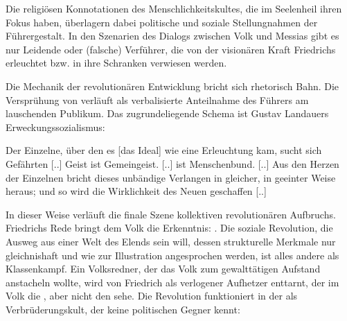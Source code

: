 Die religiösen Konnotationen des Menschlichkeitskultes, die im Seelenheil
ihren Fokus haben, überlagern dabei politische und soziale Stellungnahmen der
Führergestalt. In den Szenarien des Dialogs zwischen Volk und Messias gibt es
nur Leidende oder (falsche) Verführer, die von der visionären Kraft Friedrichs
erleuchtet bzw. in ihre Schranken verwiesen werden.

Die Mechanik der revolutionären Entwicklung bricht sich rhetorisch Bahn. Die
Versprühung von \Cite{Geist} verläuft als verbalisierte Anteilnahme des
Führers am lauschenden Publikum. Das zugrundeliegende Schema ist Gustav
Landauers Erweckungssozialismus:\label{LANDAUER}

\begin{BlockQuote}
  Der Einzelne, über den es [das Ideal] wie eine Erleuchtung kam, sucht sich
  Gefährten [..] Geist ist Gemeingeist. [..] ist Menschenbund. [..] Aus den
  Herzen der Einzelnen bricht dieses unbändige Verlangen in gleicher, in
  geeinter Weise heraus; und so wird die Wirklichkeit des Neuen geschaffen
  [..]
\end{BlockQuote}
In dieser Weise verläuft die finale Szene kollektiven revolutionären
Aufbruchs. Friedrichs Rede bringt dem Volk die Erkenntnis: \Cite{Daß wir es
  vergaßen! Wir sind doch Menschen!} .
Die soziale Revolution, die Ausweg aus
einer Welt des Elends sein will, dessen strukturelle Merkmale nur
gleichnishaft und wie zur Illustration angesprochen werden, ist alles andere
als Klassenkampf. Ein Volksredner, der das Volk zum gewalttätigen Aufstand
anstacheln wollte, wird von Friedrich als verlogener Aufhetzer enttarnt, der
im Volk die \Cite{Masse}, aber nicht den \Cite{Menschen} sehe. Die Revolution
funktioniert in der  als Verbrüderungskult, der keine
politischen Gegner kennt:

